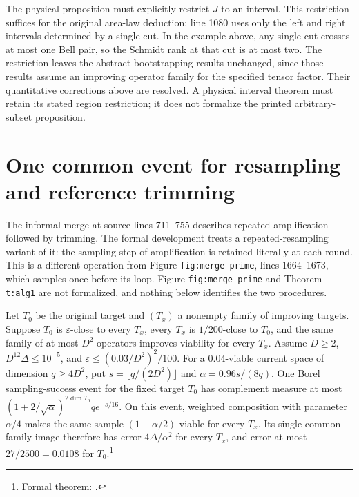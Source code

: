 \documentclass{article}
\begin{document}
The physical proposition must explicitly restrict $J$ to an interval.
This restriction suffices for the original area-law deduction: line 1080
uses only the left and right intervals determined by a single cut.
In the example above, any single cut crosses at most one Bell pair, so
the Schmidt rank at that cut is at most two.
The restriction leaves the abstract bootstrapping results unchanged, since those
results assume an improving operator family for the specified tensor
factor. Their quantitative corrections above are resolved. A physical
interval theorem must retain its stated region restriction; it does not
formalize the printed arbitrary-subset proposition.

\section{One common event for resampling and reference trimming}

The informal merge at source lines 711--755 describes repeated
amplification followed by trimming. The formal development treats a
repeated-resampling variant of it: the sampling step of amplification is
retained literally at each round. This is a different operation from
Figure \texttt{fig:merge-prime}, lines 1664--1673, which samples once
before its loop. Figure \texttt{fig:merge-prime} and Theorem
\texttt{t:alg1} are not formalized, and nothing below identifies the two
procedures.

Let $T_0$ be the original target and $(T_x)$ a nonempty family of improving
targets. Suppose $T_0$ is $\varepsilon$-close to every $T_x$, every $T_x$ is
$1/200$-close to $T_0$, and the same family of at most $D^2$ operators
improves viability for every $T_x$. Assume $D\ge2$,
$D^{12}\Delta\le10^{-5}$, and $\varepsilon\le(0.03/D^2)^2/100$.
For a $0.04$-viable current space of dimension $q\ge4D^2$, put
$s=\lfloor q/(2D^2)\rfloor$ and $\alpha=0.96s/(8q)$.
One Borel sampling-success event for the fixed target $T_0$ has complement
measure at most $(1+2/\sqrt\alpha)^{2\dim T_0}q e^{-s/16}$.
On this event, weighted composition with parameter $\alpha/4$ makes the
same sample $(1-\alpha/2)$-viable for every $T_x$. Its single common-family
image therefore has error $4\Delta/\alpha^2$ for every $T_x$, and error
at most $27/2500=0.0108$ for $T_0$.\footnote{Formal theorem:
.}
\end{document}
